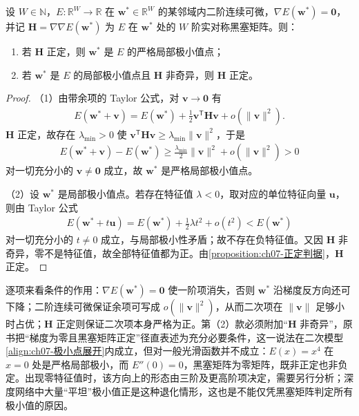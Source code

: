 \documentclass[../../main.tex]{subfiles}
\begin{document}
\begin{theorem}[局部极小值的二阶条件]\label{theorem:ch07-二阶条件}
设 $W\in\mathbb{N}$，$E:\mathbb{R}^{W}\to\mathbb{R}$ 在 $\mathbf{w}^{\ast}\in\mathbb{R}^{W}$ 的某邻域内二阶连续可微，$\nabla E(\mathbf{w}^{\ast})=\mathbf{0}$，并记 $\mathbf{H}=\nabla\nabla E(\mathbf{w}^{\ast})$ 为 $E$ 在 $\mathbf{w}^{\ast}$ 处的 $W$ 阶实对称黑塞矩阵。则：
\begin{enumerate}
\item 若 $\mathbf{H}$ 正定，则 $\mathbf{w}^{\ast}$ 是 $E$ 的严格局部极小值点；
\item 若 $\mathbf{w}^{\ast}$ 是 $E$ 的局部极小值点且 $\mathbf{H}$ 非奇异，则 $\mathbf{H}$ 正定。
\end{enumerate}
\end{theorem}
\begin{proof}
（1）由带余项的 Taylor 公式，对 $\mathbf{v}\to\mathbf{0}$ 有
\begin{align*}
E(\mathbf{w}^{\ast}+\mathbf{v}) = E(\mathbf{w}^{\ast})+\frac{1}{2}\mathbf{v}^{\mathsf T}\mathbf{H}\mathbf{v}+o(\|\mathbf{v}\|^{2}).
\end{align*}
$\mathbf{H}$ 正定，故存在 $\lambda_{\min}>0$ 使 $\mathbf{v}^{\mathsf T}\mathbf{H}\mathbf{v}\geqslant\lambda_{\min}\|\mathbf{v}\|^{2}$，于是
\begin{align*}
E(\mathbf{w}^{\ast}+\mathbf{v})-E(\mathbf{w}^{\ast}) \geqslant \frac{\lambda_{\min}}{2}\|\mathbf{v}\|^{2}+o(\|\mathbf{v}\|^{2}) > 0
\end{align*}
对一切充分小的 $\mathbf{v}\neq\mathbf{0}$ 成立，故 $\mathbf{w}^{\ast}$ 是严格局部极小值点。

（2）设 $\mathbf{w}^{\ast}$ 是局部极小值点。若存在特征值 $\lambda<0$，取对应的单位特征向量 $\mathbf{u}$，则由 Taylor 公式
\begin{align*}
E(\mathbf{w}^{\ast}+t\mathbf{u}) = E(\mathbf{w}^{\ast})+\frac{1}{2}\lambda t^{2}+o(t^{2}) < E(\mathbf{w}^{\ast})
\end{align*}
对一切充分小的 $t\neq0$ 成立，与局部极小性矛盾；故不存在负特征值。又因 $\mathbf{H}$ 非奇异，零不是特征值，故全部特征值都为正。由\cref{proposition:ch07-正定判据}，$\mathbf{H}$ 正定。
\end{proof}

\begin{remark}
逐项来看条件的作用：$\nabla E(\mathbf{w}^{\ast})=\mathbf{0}$ 使一阶项消失，否则 $\mathbf{w}^{\ast}$ 沿梯度反方向还可下降；二阶连续可微保证余项可写成 $o(\|\mathbf{v}\|^{2})$，从而二次项在 $\|\mathbf{v}\|$ 足够小时占优；$\mathbf{H}$ 正定则保证二次项本身严格为正。第（2）款必须附加“$\mathbf{H}$ 非奇异”，原书把“梯度为零且黑塞矩阵正定”径直表述为充分必要条件，这一说法在二次模型\eqref{align:ch07-极小点展开}内成立，但对一般光滑函数并不成立：$E(x)=x^{4}$ 在 $x=0$ 处是严格局部极小，而 $E''(0)=0$，黑塞矩阵为零矩阵，既非正定也非负定。出现零特征值时，该方向上的形态由三阶及更高阶项决定，需要另行分析；深度网络中大量“平坦”极小值正是这种退化情形，这也是不能仅凭黑塞矩阵判定所有极小值的原因。
\end{remark}
\end{document}
